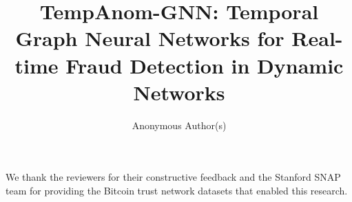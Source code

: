 \documentclass[sigconf,review]{acmart}
\title{TempAnom-GNN: Temporal Graph Neural Networks for Real-time Fraud Detection in Dynamic Networks}
\author{Anonymous Author(s)}
\affiliation{%
  \institution{Anonymous Institution}
  \city{Anonymous City}
  \country{Anonymous Country}
}
\begin{document}
\maketitle








\begin{acks}
We thank the reviewers for their constructive feedback and the Stanford SNAP team for providing the Bitcoin trust network datasets that enabled this research.
\end{acks}



\end{document}
